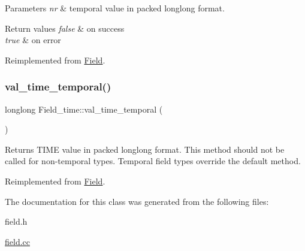 \begin{DoxyParams}{Parameters}
{\em nr} & temporal value in packed longlong format. \\
\hline
\end{DoxyParams}

\begin{DoxyRetVals}{Return values}
{\em false} & on success \\
\hline
{\em true} & on error \\
\hline
\end{DoxyRetVals}


Reimplemented from \mbox{\hyperlink{classField_a5c09752e8441d64ce2e4e611508bab7a}{Field}}.

\mbox{\label{classField__time_a7e15eb097b1cfacdabfa92de7dc3e8ed}} 
\subsubsection{\texorpdfstring{val\+\_\+time\+\_\+temporal()}{val\_time\_temporal()}}
{\footnotesize\ttfamily longlong Field\+\_\+time\+::val\+\_\+time\+\_\+temporal (\begin{DoxyParamCaption}{ }\end{DoxyParamCaption})\hspace{0.3cm}{\ttfamily [virtual]}}

Returns T\+I\+ME value in packed longlong format. This method should not be called for non-\/temporal types. Temporal field types override the default method. 

Reimplemented from \mbox{\hyperlink{classField_a504ae8be08face4684852eaa79734158}{Field}}.



The documentation for this class was generated from the following files\+:\begin{DoxyCompactItemize}
\item 
field.\+h\item 
\mbox{\hyperlink{field_8cc}{field.\+cc}}\end{DoxyCompactItemize}
